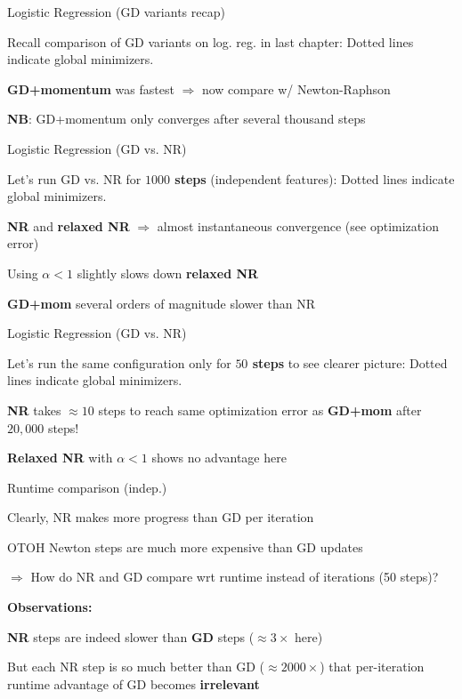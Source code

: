 \documentclass[11pt,compress,t,notes=noshow, xcolor=table]{beamer}
\begin{document}
\begin{framei}{Logistic Regression (GD variants recap)}
\item Recall comparison of GD variants on log. reg. in last chapter:
{\footnotesize Dotted lines indicate global minimizers.}
\item \textbf{GD+momentum} was fastest $\Rightarrow$ now compare w/ Newton-Raphson
\item \textbf{NB}: GD+momentum only converges after several thousand steps
\end{framei}


\begin{framei}[fs=footnotesize]{Logistic Regression (GD vs. NR)}
\item Let's run GD vs. NR for \textbf{$1000$ steps} (independent features):
Dotted lines indicate global minimizers.
\item \textbf{NR} and \textbf{relaxed NR} $\Rightarrow$ almost instantaneous convergence (see optimization error)
\item Using $\alpha<1$ slightly slows down \textbf{relaxed NR}
\item \textbf{GD+mom} several orders of magnitude slower than NR
\end{framei}


\begin{framei}[fs=footnotesize]{Logistic Regression (GD vs. NR)}
\item Let's run the same configuration only for \textbf{$50$ steps} to see clearer picture:
Dotted lines indicate global minimizers.
\item \textbf{NR} takes $\approx 10$ steps to reach same optimization error as \textbf{GD+mom} after $20,000$ steps!
\item \textbf{Relaxed NR} with $\alpha<1$ shows no advantage here
\end{framei}


\begin{framei}[fs=footnotesize]{Runtime comparison (indep.)}
\item Clearly, NR makes more progress than GD per iteration
\item OTOH Newton steps are much more expensive than GD updates
\item $\Rightarrow$ How do NR and GD compare wrt runtime instead of iterations (50 steps)?
\item[] \textbf{Observations:}
\item \textbf{NR} steps are indeed slower than \textbf{GD} steps ($\approx 3\times$ here)
\item But each NR step is so much better than GD ($\approx 2000 \times$) that per-iteration runtime advantage of GD becomes \textbf{irrelevant}
\end{framei}
\end{document}
